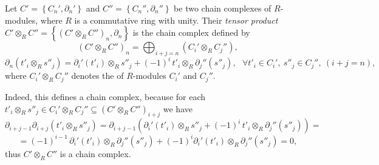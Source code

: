 \documentclass[12pt]{article}
\begin{document}

\newcommand{\cbra}[1]{\left( #1 \right)}
\newcommand{\qbra}[1]{\left[ #1 \right]}
\newcommand{\gbra}[1]{\left\{ #1 \right\}}
\newcommand{\abra}[1]{\left\langle #1 \right\rangle}

\newcommand{\pa}[1]{\partial_{#1}}
\newcommand{\pap}[1]{\partial_{#1} '}
\newcommand{\papp}[1]{\partial_{#1} ''}


Let $ C'=\gbra{C_n',\pap n}$ and $C''=\gbra{C_n'',\papp n}$ be two chain complexes of $R$-modules, where $R$ is a commutative ring with unity. Their \emph{tensor product} $C'\otimes_R C''=\gbra{(C'\otimes_R C'')_n,\pa n}$ is the chain complex defined by
$$ (C'\otimes_R C'')_n = \bigoplus_{i+j=n}(C_i'\otimes_R C_j''), $$
$$ \pa n(t'_i\otimes_R s''_j) = \pap i(t'_i)\otimes_R s''_j + (-1)^i\, t'_i\otimes_R \papp j(s''_j),\ \ \ \forall t'_i\in C_i',\ s''_j\in C_j'',\ (i+j=n),$$
where $C_i'\otimes_R C_j''$ denotes the  of $R$-modules $C_i'$ and $C_j''$.

Indeed, this defines a chain complex, because  for each $t'_i\otimes_R s''_j\in C_i'\otimes_R C_j''\subseteq (C'\otimes_R C'')_{i+j}$ we have
$$\pa{i+j-1} \pa {i+j}(t'_i\otimes_R s''_j) = \pa{i+j-1}\cbra{ \pap i(t'_i)\otimes_R s''_j + (-1)^i\, t'_i\otimes_R \papp j(s''_j) }= $$
$$ = (-1)^{i-1}\, \pap i(t'_i)\otimes_R \papp j(s''_j)+(-1)^i \pap i(t'_i)\otimes_R \papp j(s''_j)=0, $$
thus $C'\otimes_R C''$ is a chain complex.
\end{document}
